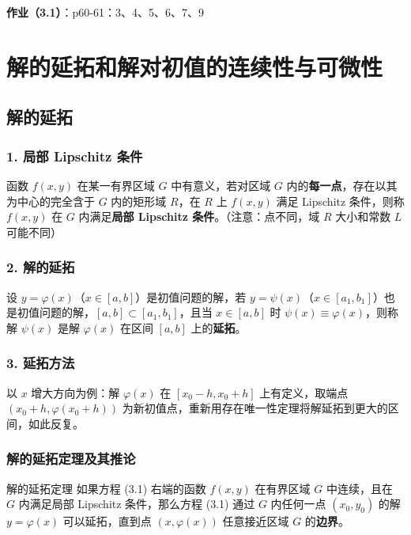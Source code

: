 \textbf{作业（3.1）}：p60-61：3、4、5、6、7、9

\section{解的延拓和解对初值的连续性与可微性}

\subsection{解的延拓}

\subsubsection{1. 局部 Lipschitz 条件}

函数 $f(x,y)$ 在某一有界区域 $G$ 中有意义，若对区域 $G$ 内的\textbf{每一点}，存在以其为中心的完全含于 $G$ 内的矩形域 $R$，在 $R$ 上 $f(x,y)$ 满足 Lipschitz 条件，则称 $f(x,y)$ 在 $G$ 内满足\textbf{局部 Lipschitz 条件}。（注意：点不同，域 $R$ 大小和常数 $L$ 可能不同）

\subsubsection{2. 解的延拓}

设 $y = \varphi(x)$（$x \in [a, b]$）是初值问题的解，若 $y = \psi(x)$（$x \in [a_1, b_1]$）也是初值问题的解，$[a, b] \subset [a_1, b_1]$，且当 $x \in [a, b]$ 时 $\psi(x) \equiv \varphi(x)$，则称解 $\psi(x)$ 是解 $\varphi(x)$ 在区间 $[a, b]$ 上的\textbf{延拓}。

\subsubsection{3. 延拓方法}

以 $x$ 增大方向为例：解 $\varphi(x)$ 在 $[x_0 - h, x_0 + h]$ 上有定义，取端点 $(x_0+h, \varphi(x_0+h))$ 为新初值点，重新用存在唯一性定理将解延拓到更大的区间，如此反复。

\subsubsection{解的延拓定理及其推论}

\begin{myTheorem}{解的延拓定理}
如果方程 (3.1) 右端的函数 $f(x,y)$ 在有界区域 $G$ 中连续，且在 $G$ 内满足局部 Lipschitz 条件，那么方程 (3.1) 通过 $G$ 内任何一点 $(x_0, y_0)$ 的解 $y = \varphi(x)$ 可以延拓，直到点 $(x, \varphi(x))$ 任意接近区域 $G$ 的\textbf{边界}。
\end{myTheorem}

